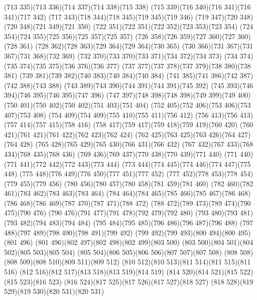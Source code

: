 \cpath (713 335)(713 336)(714 337)(714 338)(715 338)
\cpath (715 339)(716 340)(716 341)(716 341)(717 342)
\cpath (717 343)(718 344)(718 345)(719 345)(719 346)
\cpath (719 347)(720 348)(720 348)(721 349)(721 350)
\cpath (722 351)(722 351)(722 352)(723 353)(723 354)
\cpath (724 354)(724 355)(725 356)(725 357)(725 357)
\cpath (726 358)(726 359)(727 360)(727 360)(728 361)
\cpath (728 362)(728 363)(729 364)(729 364)(730 365)
\cpath (730 366)(731 367)(731 367)(731 368)(732 369)
\cpath (732 370)(733 370)(733 371)(734 372)(734 373)
\cpath (734 374)(735 374)(735 375)(736 376)(736 377)
\cpath (737 377)(737 378)(737 379)(738 380)(738 381)
\cpath (739 381)(739 382)(740 383)(740 384)(740 384)
\cpath (741 385)(741 386)(742 387)(742 388)(743 388)
\cpath (743 389)(743 390)(744 391)(744 391)(745 392)
\cpath (745 393)(746 394)(746 395)(746 395)(747 396)
\cpath (747 397)(748 398)(748 398)(749 399)(749 400)
\cpath (750 401)(750 402)(750 402)(751 403)(751 404)
\cpath (752 405)(752 406)(753 406)(753 407)(753 408)
\cpath (754 409)(754 409)(755 410)(755 411)(756 412)
\cpath (756 413)(756 413)(757 414)(757 415)(758 416)
\cpath (758 417)(759 417)(759 418)(759 419)(760 420)
\cpath (760 421)(761 421)(761 422)(762 423)(762 424)
\cpath (762 425)(763 425)(763 426)(764 427)(764 428)
\cpath (765 428)(765 429)(765 430)(766 431)(766 432)
\cpath (767 432)(767 433)(768 434)(768 435)(768 436)
\cpath (769 436)(769 437)(770 438)(770 439)(771 440)
\cpath (771 440)(771 441)(772 442)(772 443)(773 444)
\cpath (773 444)(774 445)(774 446)(774 447)(775 448)
\cpath (775 448)(776 449)(776 450)(777 451)(777 452)
\cpath (777 452)(778 453)(778 454)(779 455)(779 456)
\cpath (780 456)(780 457)(780 458)(781 459)(781 460)
\cpath (782 460)(782 461)(783 462)(783 463)(783 464)
\cpath (784 464)(784 465)(785 466)(785 467)(786 468)
\cpath (786 468)(786 469)(787 470)(787 471)(788 472)
\cpath (788 472)(789 473)(789 474)(790 475)(790 476)
\cpath (790 476)(791 477)(791 478)(792 479)(792 480)
\cpath (793 480)(793 481)(793 482)(794 483)(794 484)
\cpath (795 484)(795 485)(796 486)(796 487)(796 488)
\cpath (797 488)(797 489)(798 490)(798 491)(799 492)
\cpath (799 492)(799 493)(800 494)(800 495)(801 496)
\cpath (801 496)(802 497)(802 498)(802 499)(803 500)
\cpath (803 500)(804 501)(804 502)(805 503)(805 504)
\cpath (805 504)(806 505)(806 506)(807 507)(807 508)
\cpath (808 508)(808 509)(808 510)(809 511)(809 512)
\cpath (810 512)(810 513)(811 514)(811 515)(811 516)
\cpath (812 516)(812 517)(813 518)(813 519)(814 519)
\cpath (814 520)(814 521)(815 522)(815 523)(816 523)
\cpath (816 524)(817 525)(817 526)(817 527)(818 527)
\cpath (818 528)(819 529)(819 530)(820 531)(820 531)

